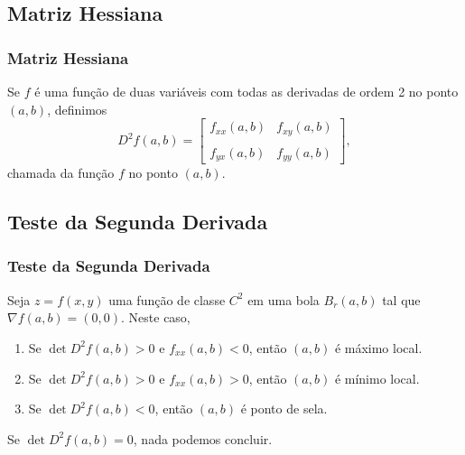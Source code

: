 \subsection*{Matriz Hessiana}
\begin{frame}[label=otimizacao]
\frametitle{Matriz Hessiana }

Se $f$ é uma função de duas variáveis com todas as derivadas de ordem 2 no ponto $(a,b)$, definimos 
\[D^2f(a,b)=\left[\begin{array}{cc}
f_{xx}(a,b) & f_{xy}(a,b)\\
\\
f_{yx}(a,b) & f_{yy}(a,b)
\end{array}   \right],\]
chamada  da função $f$ no ponto $(a,b)$.



\end{frame}

\subsection*{Teste da Segunda Derivada}
\begin{frame}[label=otimizacao]
\frametitle{Teste da Segunda Derivada}

\begin{teo}

Seja $z=f(x,y)$ uma função de classe $C^2$ em uma bola $B_r(a,b)$ tal que $\nabla f(a,b)=(0,0)$. Neste caso,
\begin{enumerate}[a]
\item Se $\det D^2f(a,b)>0$ e $f_{xx}(a,b)<0$, então $(a,b)$ é máximo local.

\item Se $\det D^2f(a,b)>0$ e $f_{xx}(a,b)>0$, então $(a,b)$ é mínimo local.

\item Se $\det D^2f(a,b)<0$, então $(a,b)$ é ponto de sela.


\end{enumerate}
\end{teo}

\begin{obs}
Se $\det D^2f(a,b)=0$, nada podemos concluir.
\end{obs}




\end{frame}

